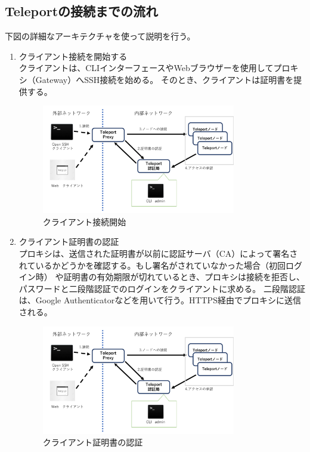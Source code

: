 \documentclass[11pt,a4j,titlepage]{jreport}
\begin{document}
\subsection*{Teleportの接続までの流れ}
下図の詳細なアーキテクチャを使って説明を行う。

\begin{enumerate}[1:]
    \setlength{\parskip}{0.1cm} %
    \setlength{\itemsep}{0.1cm}

    \item クライアント接続を開始する\mbox{}\\クライアントは、CLIインターフェースやWebブラウザーを使用してプロキシ（Gateway）へSSH接続を始める。
    そのとき、クライアントは証明書を提供する。\\
    \begin{figure}[H]
        \centering
        \includegraphics*[width=0.8\textwidth,page=2]{graphs/teleport_archtecture.pdf}
        \caption{クライアント接続開始}
        \label{teleport_connect}
    \end{figure}


    \item クライアント証明書の認証\mbox{}\\
    プロキシは、送信された証明書が以前に認証サーバ（CA）によって署名されているかどうかを確認する。もし署名がされていなかった場合（初回ログイン時）
    や証明書の有効期限が切れているとき、プロキシは接続を拒否し、パスワードと二段階認証でのログインをクライアントに求める。
    二段階認証は、Google Authenticatorなどを用いて行う。HTTPS経由でプロキシに送信される。
    \begin{figure}[H]
        \centering
        \includegraphics*[width=0.8\textwidth,page=3]{graphs/teleport_archtecture.pdf}
        \caption{クライアント証明書の認証}
        \label{teleport_certificate}
    \end{figure}


\end{enumerate}
\end{document}
